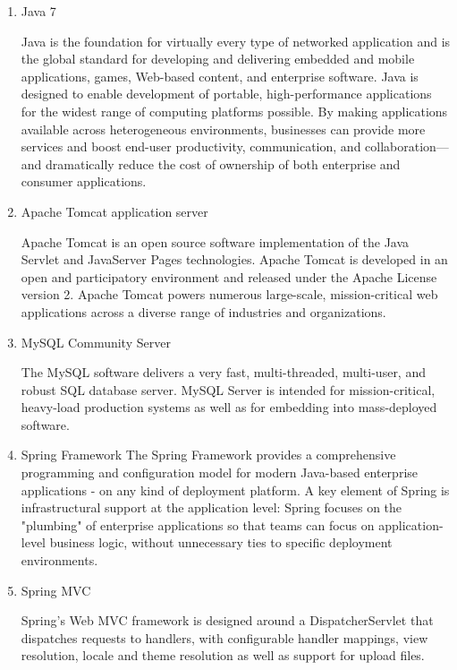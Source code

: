 \documentclass[thesis=B,english]{FITthesis}[2012/10/20]
\begin{document}
\begin{enumerate}

\item{Java 7}

Java is the foundation for virtually every type of networked application and is the global standard for developing and delivering embedded and mobile applications, games, Web-based content, and enterprise software. Java is designed to enable development of portable, high-performance applications for the widest range of computing platforms possible. By making applications available across heterogeneous environments, businesses can provide more services and boost end-user productivity, communication, and collaboration—and dramatically reduce the cost of ownership of both enterprise and consumer applications.\cite{java}

\item{Apache Tomcat application server}

Apache Tomcat is an open source software implementation of the Java Servlet and JavaServer Pages technologies. Apache Tomcat is developed in an open and participatory environment and released under the Apache License version 2. Apache Tomcat powers numerous large-scale, mission-critical web applications across a diverse range of industries and organizations.\cite{apache}

\item{MySQL Community Server}

The MySQL software delivers a very fast, multi-threaded, multi-user, and robust SQL database server. MySQL Server is intended for mission-critical, heavy-load production systems as well as for embedding into mass-deployed software.\cite{mysql}

\item{Spring Framework}
The Spring Framework provides a comprehensive programming and configuration model for modern Java-based enterprise applications - on any kind of deployment platform. A key element of Spring is infrastructural support at the application level: Spring focuses on the "plumbing" of enterprise applications so that teams can focus on application-level business logic, without unnecessary ties to specific deployment environments.\cite{spring}

\item{Spring MVC}

Spring's Web MVC framework is designed around a DispatcherServlet that dispatches requests to handlers, with configurable handler mappings, view resolution, locale and theme resolution as well as support for upload files.\cite{springmvc}


\end{enumerate}
\end{document}
